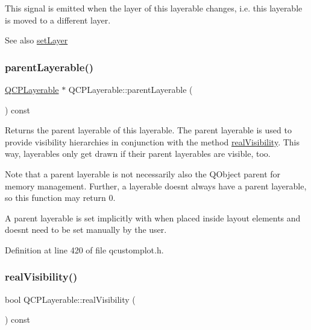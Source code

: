 This signal is emitted when the layer of this layerable changes, i.\+e. this layerable is moved to a different layer.

\begin{DoxySeeAlso}{See also}
\hyperlink{class_q_c_p_layerable_ab0d0da6d2de45a118886d2c8e16d5a54}{set\+Layer} 
\end{DoxySeeAlso}
\mbox{\label{class_q_c_p_layerable_aa78b7e644d2c519e1a9a6f2ac5fcd858}} 
\subsubsection{\texorpdfstring{parent\+Layerable()}{parentLayerable()}}
{\footnotesize\ttfamily \hyperlink{class_q_c_p_layerable}{Q\+C\+P\+Layerable} $\ast$ Q\+C\+P\+Layerable\+::parent\+Layerable (\begin{DoxyParamCaption}{ }\end{DoxyParamCaption}) const\hspace{0.3cm}{\ttfamily [inline]}}

Returns the parent layerable of this layerable. The parent layerable is used to provide visibility hierarchies in conjunction with the method \hyperlink{class_q_c_p_layerable_ab054e88f15d485defcb95e7376f119e7}{real\+Visibility}. This way, layerables only get drawn if their parent layerables are visible, too.

Note that a parent layerable is not necessarily also the Q\+Object parent for memory management. Further, a layerable doesn\textquotesingle{}t always have a parent layerable, so this function may return 0.

A parent layerable is set implicitly with when placed inside layout elements and doesn\textquotesingle{}t need to be set manually by the user. 

Definition at line 420 of file qcustomplot.\+h.

\mbox{\label{class_q_c_p_layerable_ab054e88f15d485defcb95e7376f119e7}} 
\subsubsection{\texorpdfstring{real\+Visibility()}{realVisibility()}}
{\footnotesize\ttfamily bool Q\+C\+P\+Layerable\+::real\+Visibility (\begin{DoxyParamCaption}{ }\end{DoxyParamCaption}) const}

